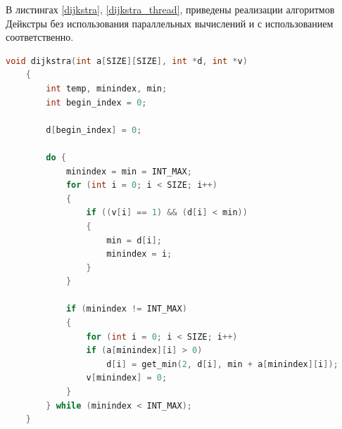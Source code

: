 \documentclass[a4paper,14pt, unknownkeysallowed]{extreport}
\begin{document}
В листингах \ref{dijkstra}, \ref{dijkstra_thread}, приведены реализации алгоритмов Дейкстры без использования параллельных вычислений и с использованием соответственно.

\clearpage

\begin{lstlisting}[label=dijkstra,caption=Алгоритм Дейкстры,language=C]
    void dijkstra(int a[SIZE][SIZE], int *d, int *v)
    {
        int temp, minindex, min;
        int begin_index = 0;
        
        d[begin_index] = 0;
      
        do {
            minindex = min = INT_MAX;
            for (int i = 0; i < SIZE; i++)
            {
                if ((v[i] == 1) && (d[i] < min))
                {
                    min = d[i];
                    minindex = i;
                }
            }
    
            if (minindex != INT_MAX)
            {
                for (int i = 0; i < SIZE; i++)
                if (a[minindex][i] > 0)
                    d[i] = get_min(2, d[i], min + a[minindex][i]);
                v[minindex] = 0;
            }
        } while (minindex < INT_MAX);
    }
\end{lstlisting}

\clearpage
\end{document}
